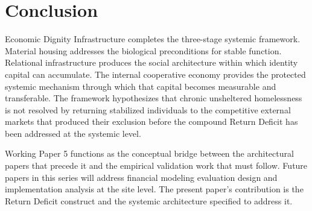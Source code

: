 \documentclass[12pt, letterpaper]{article}
\begin{document}
\section{Conclusion}

Economic Dignity Infrastructure completes the three-stage systemic framework. Material housing addresses the biological preconditions for stable function. Relational infrastructure produces the social architecture within which identity capital can accumulate. The internal cooperative economy provides the protected systemic mechanism through which that capital becomes measurable and transferable. The framework hypothesizes that chronic unsheltered homelessness is not resolved by returning stabilized individuals to the competitive external markets that produced their exclusion before the compound Return Deficit has been addressed at the systemic level.

Working Paper 5 functions as the conceptual bridge between the architectural papers that precede it and the empirical validation work that must follow. Future papers in this series will address financial modeling evaluation design and implementation analysis at the site level. The present paper's contribution is the Return Deficit construct and the systemic architecture specified to address it.

\newpage
{}


\end{document}
